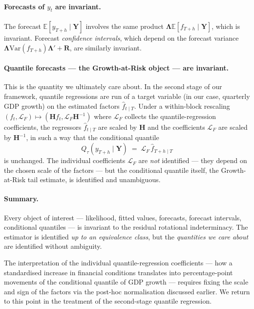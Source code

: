 \documentclass[11pt, a4paper, oneside]{article}
\newcommand{\mL}{\boldsymbol{\Lambda}}
\begin{document}
\paragraph{Forecasts of $y_t$ are invariant.}
The forecast $\mathbb{E}[y_{T+h} \mid \mathbf{Y}]$ involves the same
product $\mL \mathbb{E}[f_{T+h} \mid \mathbf{Y}]$, which is
invariant. Forecast \emph{confidence intervals}, which depend on the
forecast variance $\mL \mathrm{Var}(f_{T+h}) \mL' + \mathbf{R}$,
are similarly invariant.

\paragraph{Quantile forecasts — the Growth-at-Risk object — are invariant.}
This is the quantity we ultimately care about. In the second stage of
our framework, quantile regressions are run of a target variable (in
our case, quarterly GDP growth) on the estimated factors
$\hat{f}_{t \mid T}$. Under a within-block rescaling
$(f_t, \mathcal{L}_F) \mapsto (\mathbf{H} f_t, \mathcal{L}_F \mathbf{H}^{-1})$
where $\mathcal{L}_F$ collects the quantile-regression coefficients,
the regressors $\hat{f}_{t \mid T}$ are scaled by $\mathbf{H}$ and
the coefficients $\mathcal{L}_F$ are scaled by $\mathbf{H}^{-1}$,
in such a way that the conditional quantile
\[
Q_\tau(y_{T+h} \mid \mathbf{Y}) \;=\; \mathcal{L}_F\, \hat{f}_{T+h \mid T}
\]
is unchanged. The individual coefficients $\mathcal{L}_F$ are
\emph{not} identified — they depend on the chosen scale of the
factors — but the conditional quantile itself, the Growth-at-Risk
tail estimate, is identified and unambiguous.

\paragraph{Summary.}
Every object of interest — likelihood, fitted values, forecasts,
forecast intervals, conditional quantiles — is invariant to the
residual rotational indeterminacy. The estimator is identified
\emph{up to an equivalence class}, but the \emph{quantities we care
about} are identified without ambiguity.

The interpretation of the individual quantile-regression coefficients
— how a standardised increase in financial conditions translates into
percentage-point movements of the conditional quantile of GDP growth
— requires fixing the scale and sign of the factors via the post-hoc
normalisation discussed earlier. We return to this point in the
treatment of the second-stage quantile regression.
\end{document}
